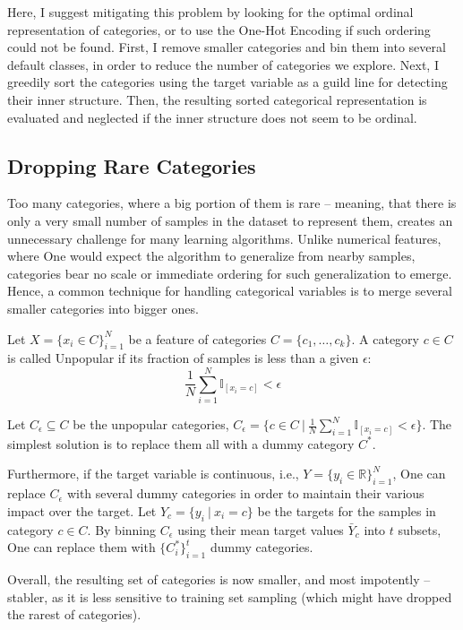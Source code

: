 \documentclass{article}
\begin{document}
Here, I suggest mitigating this problem by looking for the optimal ordinal representation of categories, or to use the One-Hot Encoding if such ordering could not be found. First, I remove smaller categories and bin them into several default classes, in order to reduce the number of categories we explore. Next, I greedily sort the categories using the target variable as a guild line for detecting their inner structure. Then, the resulting sorted categorical representation is evaluated and neglected if the inner structure does not seem to be ordinal.

\subsection{Dropping Rare Categories}
Too many categories, where a big portion of them is rare -- meaning, that there is only a very small number of samples in the dataset to represent them, creates an unnecessary challenge for many learning algorithms. Unlike numerical features, where One would expect the algorithm to generalize from nearby samples, categories bear no scale or immediate ordering for such generalization to emerge. Hence, a common technique for handling categorical variables is to merge several smaller categories into bigger ones. 

Let $X=\{x_i \in C\}_{i=1}^N$ be a feature of categories $C=\{c_1,\dots,c_k\}$. A category $c\in C$ is called Unpopular if its fraction of samples is less than a given $\epsilon$: 
$$\frac1N \sum_{i=1}^{N}\mathbb{I}_{[x_i = c]} < \epsilon$$

Let $C_\epsilon \subseteq C$ be the unpopular categories, $C_\epsilon = \{c \in C\ \vert \ \frac1N \sum_{i=1}^{N}\mathbb{I}_{[x_i = c]} < \epsilon \}$. The simplest solution is to replace them all with a dummy category $C^*$. 

Furthermore, if the target variable is continuous, i.e., $Y = \{y_i \in \mathbb{R}\}_{i=1}^N$, One can replace $C_\epsilon$ with several dummy categories in order to maintain their various impact over the target. Let $Y_c = \{y_i\ \vert\ x_i = c\}$ be the targets for the samples in category $c\in C$. By binning $C_\epsilon$ using their mean target values $\bar{Y}_c$ into $t$ subsets, One can replace them with $\{C_i^*\}_{i=1}^t$ dummy categories.

Overall, the resulting set of categories is now smaller, and most impotently -- stabler, as it is less sensitive to training set sampling (which might have dropped the rarest of categories).
\end{document}
